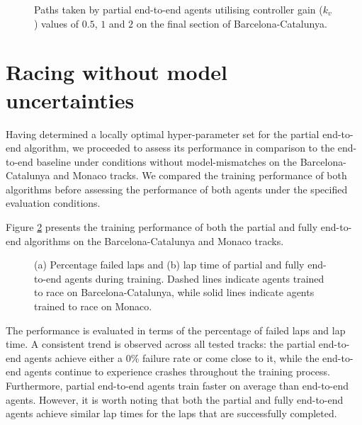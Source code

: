 \begin{figure}[htb!]
    \centering
    
    \caption[Paths taken by partial end-to-end agents utilising controller gain ($k_v$) values of $0.5$, $1$ and $2$ on the final section of  Barcelona-Catalunya]{Paths taken by partial end-to-end agents utilising controller gain ($k_v$) values of $0.5$, $1$ and $2$ on the final section of  Barcelona-Catalunya.}
    \label{fig:kv_paths}
\end{figure}









\section{Racing without model uncertainties}

Having determined a locally optimal hyper-parameter set for the partial end-to-end algorithm, we proceeded to assess its performance in comparison to the end-to-end baseline under conditions without model-mismatches on the Barcelona-Catalunya and Monaco tracks. 
We compared the training performance of both algorithms before assessing the performance of both agents under the specified evaluation conditions.


Figure \ref{fig:all_tracks_train} presents the training performance of both the partial and fully end-to-end algorithms on the Barcelona-Catalunya and Monaco tracks. 
\begin{figure}[htb!]
    \centering
    
    \caption[Learning curves of partial and fully end-to-end agents trained to race on the Porto and Monaco tracks]{(a) Percentage failed laps and (b) lap time of partial and fully end-to-end agents during training. Dashed lines indicate agents trained to race on Barcelona-Catalunya, while solid lines indicate agents trained to race on Monaco.}
    \label{fig:all_tracks_train}
\end{figure}
The performance is evaluated in terms of the percentage of failed laps and lap time.
A consistent trend is observed across all tested tracks: the partial end-to-end agents achieve either a $0\%$ failure rate or come close to it, while the end-to-end agents continue to experience crashes throughout the training process.
Furthermore, partial end-to-end agents train faster on average than end-to-end agents.
However, it is worth noting that both the partial and fully end-to-end agents achieve similar lap times for the laps that are successfully completed. 


